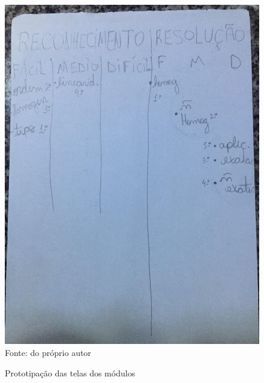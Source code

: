 \begin{figure}[H]
\centering
\caption{Prototipação das telas dos módulos}
\includegraphics[scale=0.13]{figuras/prot1.jpg}
\label{prot1}
\\
\small{Fonte: do próprio autor}
\end{figure}
